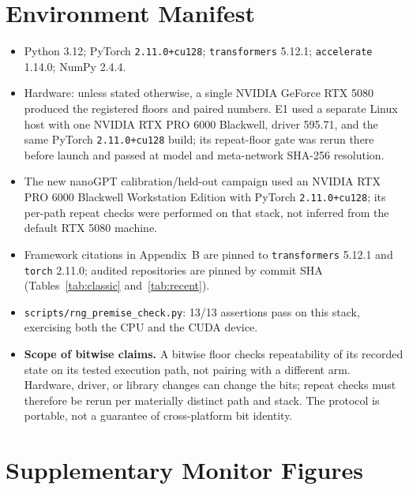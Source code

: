 \documentclass[10pt,letterpaper]{article}
\theoremstyle{remark}
\newcommand{\code}[1]{\texttt{#1}}
\begin{document}
\section{Environment Manifest}
\label{sec:env}

\begin{itemize}\itemsep2pt
\item Python 3.12; PyTorch \code{2.11.0+cu128}; \code{transformers}
5.12.1; \code{accelerate} 1.14.0; NumPy 2.4.4.
\item Hardware: unless stated otherwise, a single NVIDIA GeForce RTX 5080
produced the registered floors and paired numbers. E1 used a separate Linux
host with one NVIDIA RTX PRO 6000 Blackwell, driver 595.71, and the same
PyTorch \code{2.11.0+cu128} build; its repeat-floor gate was rerun there
before launch and passed at model and meta-network SHA-256 resolution.
\item The new nanoGPT calibration/held-out campaign used an NVIDIA RTX PRO
6000 Blackwell Workstation Edition with PyTorch \code{2.11.0+cu128};
its per-path repeat checks were performed on that stack, not inferred from
the default RTX 5080 machine.
\item Framework citations in Appendix~B are pinned to \code{transformers}
5.12.1 and \code{torch} 2.11.0; audited repositories are pinned by commit
SHA (Tables~\ref{tab:classic} and~\ref{tab:recent}).
\item \code{scripts/rng\_premise\_check.py}: 13/13 assertions pass on this
stack, exercising both the CPU and the CUDA device.
\item \textbf{Scope of bitwise claims.} A bitwise floor checks repeatability
of its recorded state on its tested execution path, not pairing with a
different arm. Hardware, driver, or library changes can change the bits;
repeat checks must therefore be rerun per materially distinct path and stack.
The protocol is portable, not a guarantee of cross-platform bit identity.
\end{itemize}

\section{Supplementary Monitor Figures}
\label{sec:monitorfigs}

\end{document}
